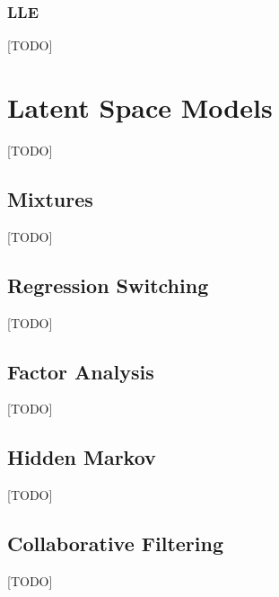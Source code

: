 \documentclass[12pt,a4paper]{article}
\theoremstyle{plain}
\theoremstyle{definition}
\begin{document}
\subsubsection{LLE}
[TODO]



\section{Latent Space Models}
\label{sec:latent_space}
[TODO]


\subsection{Mixtures}
[TODO]


\subsection{Regression Switching}
[TODO]



\subsection{Factor Analysis}
[TODO]


\subsection{Hidden Markov}
[TODO]


\subsection{Collaborative Filtering}
[TODO]







\newpage
\listofalgorithms




\end{document}
